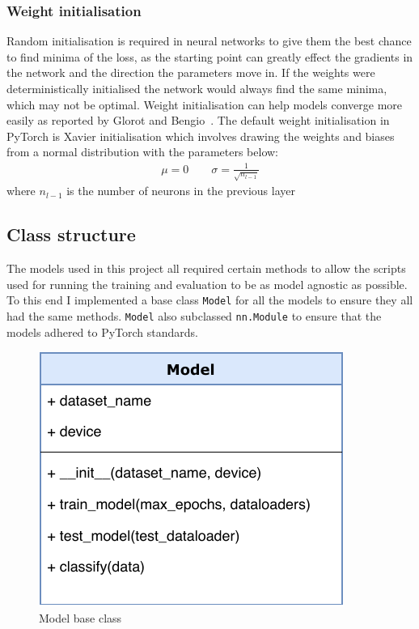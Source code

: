 \subsubsection{Weight initialisation}
Random initialisation is required in neural networks to give them the best chance to find minima of the loss, as the starting 
point can greatly effect the gradients in the network and the direction the parameters move in. If the weights were 
deterministically initialised the network would always find the same minima, which may not be optimal.
Weight initialisation can help models converge more easily as reported by Glorot and Bengio~\cite{DBLP:journals/jmlr/GlorotB10}.
The default weight initialisation in PyTorch is Xavier initialisation which involves drawing the weights and biases from a normal 
distribution with the parameters below:
\begin{align*}
  \mu = 0 \qquad \sigma = \frac{1}{\sqrt{n_{l-1}}}
\end{align*}
where $n_{l-1}$ is the number of neurons in the previous layer

\subsection{Class structure}

The models used in this project all required certain methods to allow the scripts used for running the training and evaluation to be as 
model agnostic as possible. To this end I implemented a base class \texttt{Model} for all the models to ensure they all had the same methods.
\texttt{Model} also subclassed \texttt{nn.Module} to ensure that the models adhered to PyTorch standards.
\begin{figure}[H]
  \centering
  \includegraphics[scale=0.5]{figs/model_class.pdf}
  \caption{Model base class}
\end{figure}

